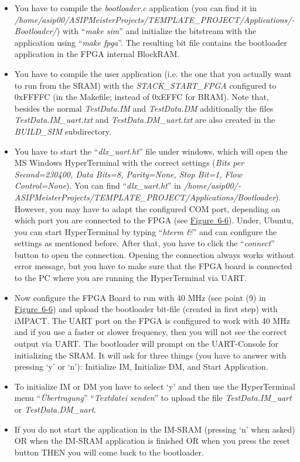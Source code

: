 \documentclass[
]{article}
\begin{document}
\begin{itemize}
\item
  You have to compile the \emph{bootloader.c} application (you can find
  it in
  \emph{/home/asip00/­ASIPMeisterProjects/­TEMPLATE\_PROJECT/­Applications/­Bootloader/})
  with ``\emph{make sim}'' and initialize the bitstream with the
  application using ``\emph{make fpga}''. The resulting bit file
  contains the bootloader application in the FPGA internal BlockRAM.
\item
  You have to compile the user application (i.e. the one that you
  actually want to run from the SRAM) with the \emph{STACK\_START\_FPGA}
  configured to 0xFFFFC (in the Makefile; instead of 0xEFFC for BRAM).
  Note that, besides the normal \emph{TestData.IM} and
  \emph{TestData.DM} additionally the files \emph{TestData.IM\_uart.txt}
  and \emph{TestData.DM\_uart.txt} are also created in the
  \emph{BUILD\_SIM} subdirectory.
\item
  You have to start the ``\emph{dlx\_uart.ht}'' file under windows,
  which will open the MS Windows HyperTerminal with the correct settings
  (\emph{Bits per Second=230400, Data Bits=8, Parity=None, Stop Bit=1,
  Flow Control=None}). You can find ``\emph{dlx\_uart.ht}'' in
  \emph{/home/asip00/­ASIPMeisterProjects/­TEMPLATE\_PROJECT/­Applications/­Bootloader}).
  However, you may have to adapt the configured COM port, depending on
  which port you are connected to the FPGA (see
  \protect\hyperlink{Fig66}{Figure~6-6}). Under, Ubuntu, you can start
  HyperTerminal by typing ``\emph{hterm \&}'' and can configure the
  settings as mentioned before. After that, you have to click the
  ``\emph{connect}'' button to open the connection. Opening the
  connection always works without error message, but you have to make
  sure that the FPGA board is connected to the PC where you are running
  the HyperTerminal via UART.
\item
  Now configure the FPGA Board to run with 40 MHz (see point (9) in
  \protect\hyperlink{Fig66}{Figure~6-6}) and upload the bootloader
  bit-file (created in first step) with iMPACT. The UART port on the
  FPGA is configured to work with 40 MHz and if you use a faster or
  slower frequency, then you will not see the correct output via UART.
  The bootloader will prompt on the UART-Console for initializing the
  SRAM. It will ask for three things (you have to answer with pressing
  `y' or `n'): Initialize IM, Initialize DM, and Start Application.
\item
  To initialize IM or DM you have to select `y' and then use the
  HyperTerminal menu ``\emph{Übertragung}'' ``\emph{Textdatei senden}''
  to upload the file \emph{TestData.IM\_uart} or
  \emph{TestData.DM\_uart}.
\item
  If you do not start the application in the IM-SRAM (pressing `n' when
  asked) OR when the IM-SRAM application is finished OR when you press
  the reset button THEN you will come back to the bootloader.
\end{itemize}
\end{document}
